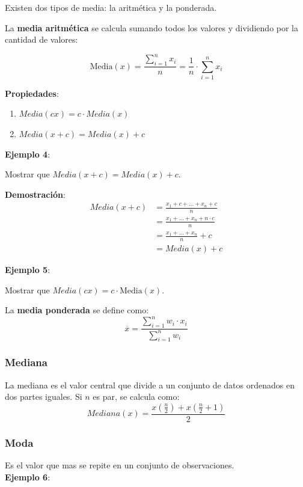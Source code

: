 \documentclass{article}
\begin{document}
\noindent Existen dos tipos de media: la aritmética y la ponderada.

\noindent La \textbf{media aritmética} se calcula sumando todos los valores y dividiendo por la cantidad de valores:

\[
    \text{Media}(x) = \frac{\sum_{i=1}^{n} x_i}{n} = \frac{1}{n} \cdot \sum_{i=1}^{n}x_i
\]

\textbf{Propiedades}:
\begin{enumerate}
    \item $Media(cx) = c \cdot Media(x)$
    \item $Media(x+c) = Media(x) + c$
\end{enumerate}

\textbf{Ejemplo 4}:

Mostrar que $Media(x+c) = Media(x) + c$.

\textbf{Demostración}:
\[
    \begin{aligned}
        Media(x+c) & = \frac{x_1+c + \ldots + x_n+c}{n}         \\
                   & = \frac{x_1 + \ldots + x_n + n \cdot c}{n} \\
                   & = \frac{x_1 + \ldots + x_n}{n} + c         \\
                   & = Media(x) + c
    \end{aligned}
\]

\textbf{Ejemplo 5}:

Mostrar que $Media(cx) = c \cdot \text{Media}(x)$.

La \textbf{media ponderada} se define como:
\[
    \overline{x} = \frac{\sum_{i=1}^{n} w_i \cdot x_i}{\sum_{i=1}^{n} w_i}
\]

\subsubsection{Mediana}

\noindent La mediana es el valor central que divide a un conjunto de datos ordenados en dos partes iguales. Si $n$ es par, se calcula como:
\[
    Mediana(x) = \frac{x(\frac{n}{2}) + x(\frac{n}{2} + 1)}{2}
\]


\subsubsection{Moda}

\noindent Es el valor que mas se repite en un conjunto  de observaciones. \\
\textbf{Ejemplo 6}:
\end{document}
